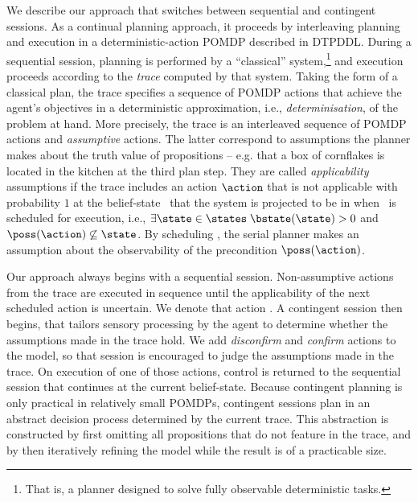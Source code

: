 

We describe our approach that switches between sequential and
contingent sessions. As a continual planning approach, it proceeds by
interleaving planning and execution in a deterministic-action POMDP
described in DTPDDL. During a sequential session, planning is
performed by a ``classical'' system,\footnote{That is, a planner
designed to solve fully observable deterministic tasks.}  and
execution proceeds according to the {\em trace} computed by that
system. Taking the form of a classical plan, the trace specifies a
sequence of POMDP actions that achieve the agent's objectives in a
deterministic approximation, i.e., {\em determinisation}, of the
problem at hand. More precisely, the trace is an interleaved sequence
of POMDP actions and {\em assumptive} actions. The latter correspond
to assumptions the planner makes about the truth value of propositions
-- e.g. that a box of cornflakes is located in the kitchen at the
third plan step. They are called {\em applicability} assumptions if
the trace includes an action $\action$ that is not applicable with
probability $1$ at the belief-state
\bstate\ that the system is projected to be in when \action\ is
scheduled for execution, i.e., $\exists\state\in\states\;
\bstate(\state) > 0$ and $\poss(\action)\not\subseteq\state$. By
scheduling
\action,  the serial planner makes an assumption about the
observability of the precondition $\poss(\action)$.

Our approach always begins with a sequential session. Non-assumptive
actions from the trace are executed in sequence until the
applicability of the next scheduled action is uncertain. We denote
that action \switchAction.  A contingent session then begins, that
tailors sensory processing by the agent to determine whether the
assumptions made in the trace hold. 
We add {\em disconfirm} and {\em confirm} actions to the model, so
that session is encouraged to judge the assumptions made in the
trace. On execution of one of those actions, control is returned to
the sequential session that continues at the current%
belief-state.
Because contingent planning is only practical in relatively small
POMDPs, contingent sessions plan in an abstract decision process
determined by the current trace. This abstraction is constructed by
first omitting all propositions that do not feature in the trace, and
by then iteratively refining the model while the result is of a
practicable size.

